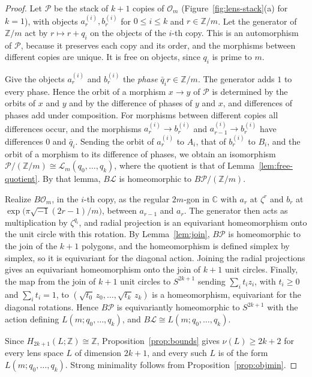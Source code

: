 \documentclass[12pt]{amsart}
\theoremstyle{definition}
\theoremstyle{remark}
\newcommand{\PP}{\mathcal{P}}
\newcommand{\Z}{\mathbb{Z}}
\begin{document}
\begin{proof}
Let $\PP$ be the stack of $k+1$ copies of $\mathcal O_m$ (Figure~\ref{fig:lens-stack}(a) for $k=1$), with objects $a_r^{(i)},b_r^{(i)}$ for $0\le i\le k$ and $r\in\Z/m$. Let the generator of $\Z/m$ act by $r\mapsto r+q_i$ on the objects of the $i$-th copy. This is an automorphism of $\PP$, because it preserves each copy and its order, and the morphisms between different copies are unique. It is free on objects, since $q_i$ is prime to $m$.

Give the objects $a_r^{(i)}$ and $b_r^{(i)}$ the \emph{phase} $\bar q_ir\in\Z/m$. The generator adds $1$ to every phase. Hence the orbit of a morphism $x\to y$ of $\PP$ is determined by the orbits of $x$ and $y$ and by the difference of phases of $y$ and $x$, and differences of phases add under composition. For morphisms between different copies all differences occur, and the morphisms $a_r^{(i)}\to b_r^{(i)}$ and $a_{r-1}^{(i)}\to b_r^{(i)}$ have differences $0$ and $\bar q_i$. Sending the orbit of $a_r^{(i)}$ to $A_i$, that of $b_r^{(i)}$ to $B_i$, and the orbit of a morphism to its difference of phases, we obtain an isomorphism $\PP/(\Z/m)\cong\mathcal L_m(q_0,\dots,q_k)$, where the quotient is that of Lemma~\ref{lem:free-quotient}. By that lemma, $B\mathcal L$ is homeomorphic to $B\PP/(\Z/m)$.

Realize $B\mathcal O_m$, in the $i$-th copy, as the regular $2m$-gon in $\mathbb C$ with $a_r$ at $\zeta^r$ and $b_r$ at $\exp\bigl(\pi\sqrt{-1}(2r-1)/m\bigr)$, between $a_{r-1}$ and $a_r$. The generator then acts as multiplication by $\zeta^{q_i}$, and radial projection is an equivariant homeomorphism onto the unit circle with this rotation. By Lemma~\ref{lem:join}, $B\PP$ is homeomorphic to the join of the $k+1$ polygons, and the homeomorphism is defined simplex by simplex, so it is equivariant for the diagonal action. Joining the radial projections gives an equivariant homeomorphism onto the join of $k+1$ unit circles. Finally, the map from the join of $k+1$ unit circles to $S^{2k+1}$ sending $\sum_it_iz_i$, with $t_i\ge0$ and $\sum_it_i=1$, to $(\sqrt{t_0}\,z_0,\dots,\sqrt{t_k}\,z_k)$ is a homeomorphism, equivariant for the diagonal rotations. Hence $B\PP$ is equivariantly homeomorphic to $S^{2k+1}$ with the action defining $L(m;q_0,\dots,q_k)$, and $B\mathcal L\cong L(m;q_0,\dots,q_k)$.

Since $H_{2k+1}(L;\Z)\cong\Z$, Proposition~\ref{prop:bounds} gives $\nu(L)\ge2k+2$ for every lens space $L$ of dimension $2k+1$, and every such $L$ is of the form $L(m;q_0,\dots,q_k)$. Strong minimality follows from Proposition~\ref{prop:objmin}.
\end{proof}
\end{document}
